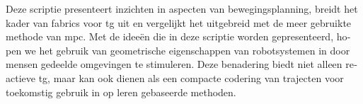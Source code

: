\begin{otherlanguage}{dutch}
Deze scriptie presenteert inzichten in aspecten van bewegingsplanning, breidt
het kader van \ac{fabrics} voor \ac{tg} uit en vergelijkt het uitgebreid met de
meer gebruikte methode van \ac{mpc}. Met de ideeën die in deze scriptie worden
gepresenteerd, hopen we het gebruik van geometrische eigenschappen van
robotsystemen in door mensen gedeelde omgevingen te stimuleren. Deze benadering
biedt niet alleen reactieve \ac{tg}, maar kan ook dienen als een compacte
codering van trajecten voor toekomstig gebruik in op leren gebaseerde methoden.
\end{otherlanguage}
